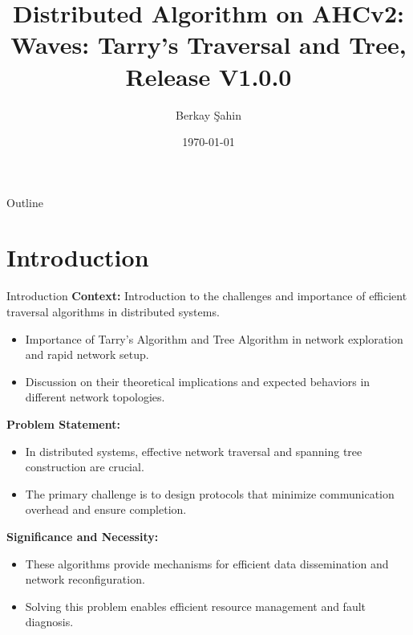 \documentclass[11pt]{beamer}  %
\title[Distributed Algorithm on AHCv2]{Distributed Algorithm on AHCv2: Waves: Tarry's Traversal and Tree, Release V1.0.0}
\author[Berkay Şahin]{Berkay Şahin\\}
\date{\today}
\begin{document}
\begin{frame}[plain]
    \titlepage
\end{frame}

\begin{frame}{Outline}
    \tableofcontents
\end{frame}

\section{Introduction}
\begin{frame}{Introduction}
    \textbf{Context:} Introduction to the challenges and importance of efficient traversal algorithms in distributed systems.
    \begin{itemize}
        \item Importance of Tarry's Algorithm and Tree Algorithm in network exploration and rapid network setup.
        \item Discussion on their theoretical implications and expected behaviors in different network topologies.
    \end{itemize}
    \textbf{Problem Statement:}
    \begin{itemize}
        \item In distributed systems, effective network traversal and spanning tree construction are crucial.
        \item The primary challenge is to design protocols that minimize communication overhead and ensure completion.
    \end{itemize}
    \textbf{Significance and Necessity:}
    \begin{itemize}
        \item These algorithms provide mechanisms for efficient data dissemination and network reconfiguration.
        \item Solving this problem enables efficient resource management and fault diagnosis.
    \end{itemize}
\end{frame}
\end{document}
